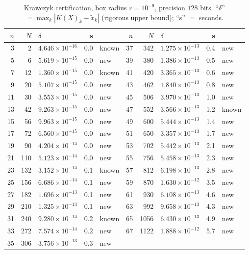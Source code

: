 \documentclass[11pt]{amsart}
\theoremstyle{definition}
\theoremstyle{remark}
\begin{document}
\begin{table}[ht]
\centering\small
\caption{Krawczyk certification, box radius $r=10^{-9}$, precision $128$ bits. ``$\delta$'' $=\max_k|K(X)_k-\tilde x_k|$ (rigorous upper bound); ``s'' $=$ seconds.}\label{tab:cert}
\begin{tabular}{rrlrl@{\qquad}rrlrl}
\toprule
$n$ & $N$ & $\delta$ & s & & $n$ & $N$ & $\delta$ & s & \\
\midrule
3 & 2 & $4.646\times10^{-16}$ & 0.0 & known & 37 & 342 & $1.275\times10^{-13}$ & 0.4 & new\\
5 & 6 & $5.619\times10^{-15}$ & 0.0 & new & 39 & 380 & $1.386\times10^{-13}$ & 0.5 & new\\
7 & 12 & $1.360\times10^{-15}$ & 0.0 & known & 41 & 420 & $3.365\times10^{-13}$ & 0.6 & new\\
9 & 20 & $5.107\times10^{-15}$ & 0.0 & new & 43 & 462 & $1.840\times10^{-13}$ & 0.8 & new\\
11 & 30 & $3.553\times10^{-15}$ & 0.0 & new & 45 & 506 & $3.970\times10^{-13}$ & 1.0 & new\\
13 & 42 & $9.263\times10^{-15}$ & 0.0 & new & 47 & 552 & $3.566\times10^{-13}$ & 1.2 & known\\
15 & 56 & $9.963\times10^{-15}$ & 0.0 & new & 49 & 600 & $5.444\times10^{-13}$ & 1.4 & new\\
17 & 72 & $6.560\times10^{-15}$ & 0.0 & new & 51 & 650 & $3.357\times10^{-13}$ & 1.7 & new\\
19 & 90 & $4.204\times10^{-14}$ & 0.0 & new & 53 & 702 & $5.442\times10^{-13}$ & 2.1 & new\\
21 & 110 & $5.123\times10^{-14}$ & 0.0 & new & 55 & 756 & $5.458\times10^{-13}$ & 2.3 & new\\
23 & 132 & $3.152\times10^{-14}$ & 0.1 & known & 57 & 812 & $6.198\times10^{-13}$ & 2.8 & new\\
25 & 156 & $6.686\times10^{-14}$ & 0.1 & new & 59 & 870 & $1.630\times10^{-12}$ & 3.5 & new\\
27 & 182 & $1.696\times10^{-13}$ & 0.1 & new & 61 & 930 & $6.108\times10^{-13}$ & 4.6 & new\\
29 & 210 & $1.325\times10^{-13}$ & 0.1 & new & 63 & 992 & $9.658\times10^{-13}$ & 4.3 & new\\
31 & 240 & $9.280\times10^{-14}$ & 0.2 & known & 65 & 1056 & $6.430\times10^{-13}$ & 4.9 & new\\
33 & 272 & $7.574\times10^{-14}$ & 0.2 & new & 67 & 1122 & $1.888\times10^{-12}$ & 5.7 & new\\
35 & 306 & $3.756\times10^{-13}$ & 0.3 & new & &&&&\\
\bottomrule
\end{tabular}
\end{table}
\end{document}
